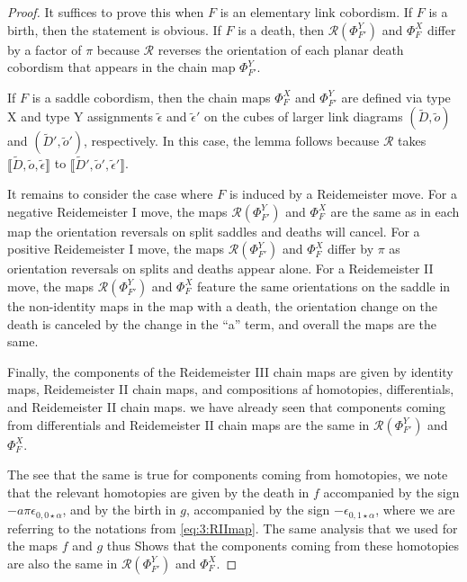 \documentclass[12pt]{amsart}
\theoremstyle{definition}
\theoremstyle{plain}
\begin{document}
\begin{proof} It suffices to prove this when $F$ is an elementary link cobordism.
If $F$ is a birth, then the statement is obvious. If $F$ is a death, then
$\mathcal{R}(\Phi^Y_{F'})$ and $\Phi^X_F$ differ by a factor of $\pi$ because $\mathcal{R}$ reverses
the orientation of each planar death cobordism that appears in the chain map $\Phi^Y_{F'}$.

If $F$ is a saddle cobordism, then the chain maps $\Phi^X_F$ and $\Phi^Y_{F'}$
are defined via type X and type Y assignments $\widetilde{\epsilon}$ and $\widetilde{\epsilon}'$
on the cubes of larger link diagrams $(\widetilde{D},\widetilde{o})$ and $(\widetilde{D}',\widetilde{o}')$,
respectively. In this case, the lemma follows because $\mathcal{R}$ takes
$\llbracket\widetilde{D},\widetilde{o},\widetilde{\epsilon}\rrbracket$ to
$\llbracket\widetilde{D}',\widetilde{o}',\widetilde{\epsilon}'\rrbracket$.

It remains to consider the case where $F$ is induced by a Reidemeister move.
For a negative Reidemeister I move, the maps $\mathcal{R}(\Phi^Y_{F'})$ and $\Phi^X_F$ are the same as in each map the orientation reversals on split saddles and deaths will cancel.
For a positive Reidemeister I move, the maps $\mathcal{R}(\Phi^Y_{F'})$ and $\Phi^X_F$ differ by $\pi$ as orientation reversals on splits and deaths appear alone.
For a Reidemeister II move, the maps $\mathcal{R}(\Phi^Y_{F'})$ and $\Phi^X_F$ feature the same orientations on the saddle in the non-identity maps in the map with a death, the orientation change on the death is canceled by the change in the ``a'' term, and overall the maps are the same.

Finally, the components of the Reidemeister III chain maps
are given by identity maps, Reidemeister II chain maps, and compositions
af homotopies, differentials, and Reidemeister II chain maps.
we have already seen that components coming from differentials
and Reidemeister II chain maps are the same in
$\mathcal{R}(\Phi^Y_{F'})$ and $\Phi^X_F$.

The see that the same is true for components coming from homotopies,
we note that the relevant homotopies are given by the death in $f$
accompanied by the sign $-a\pi\epsilon_{0,0\star\alpha}$, and
by the birth in $g$, accompanied by the sign $-\epsilon_{0,1\star\alpha}$,
where we are referring to the notations from \eqref{eq:3:RIImap}.
The same analysis that we used for the maps $f$ and $g$ thus
Shows that the components coming from these homotopies
are also the same in $\mathcal{R}(\Phi^Y_{F'})$ and $\Phi^X_F$.
\end{proof}
\end{document}
